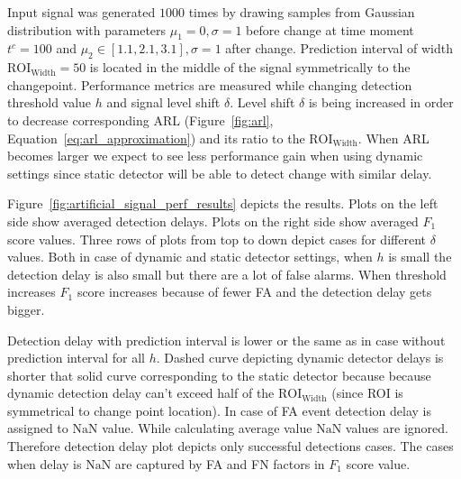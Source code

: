 Input signal was generated $1000$ times by drawing samples from Gaussian distribution with parameters $\mu_1=0, \sigma=1$ before change at time moment $t^c = 100$ and $\mu_2 \in [1.1, 2.1, 3.1], \sigma=1$ after change.
Prediction interval of width $\text{ROI}_{\text{Width}}=50$ is located in the middle of the signal symmetrically to the changepoint.
Performance metrics are measured while changing detection threshold value $h$ and signal level shift $\delta$.
Level shift $\delta$ is being increased in order to decrease corresponding ARL (Figure~\ref{fig:arl}, Equation~\ref{eq:arl_approximation}) and its ratio to the $\text{ROI}_{\text{Width}}$.
When ARL becomes larger we expect to see less performance gain when using dynamic settings since static detector will be able to detect change with similar delay.

Figure~\ref{fig:artificial_signal_perf_results} depicts the results.
Plots on the left side show averaged detection delays.
Plots on the right side show averaged $F_1$ score values.
Three rows of plots from top to down depict cases for different $\delta$ values.
Both in case of dynamic and static detector settings, when $h$ is small the detection delay is also small but there are a lot of false alarms. 
When threshold increases $F_1$ score increases because of fewer FA and the detection delay gets bigger. 

Detection delay with prediction interval is lower or the same as in case without prediction interval for all $h$.
Dashed curve depicting dynamic detector delays is shorter that solid curve corresponding to the static detector because because dynamic detection delay can't exceed half of the $\text{ROI}_{\text{Width}}$ (since ROI is symmetrical to change point location). 
In case of FA event detection delay is assigned to $\text{NaN}$ value. 
While calculating average value $\text{NaN}$ values are ignored. 
Therefore detection delay plot depicts only successful detections cases. 
The cases when delay is $\text{NaN}$ are captured by FA and FN factors in $F_1$ score value.

